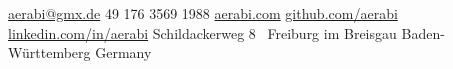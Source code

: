\documentclass[10pt,a4paper]{article}
\begin{document}
\sloppy  %



\nobreakvspace{0.3em}  %

\noindent\href{mailto:aerabi.at.gmx.dot.de}{aerabi\mbox{}@\mbox{}gmx.de}\sbull
\textsmaller{+}49 176 3569 1988\sbull
\href{http://aerabi.com}{aerabi.com}\sbull 
\href{https://github.com/aerabi}{github.com/aerabi} \sbull
\href{http://www.linkedin.com/in/aerabi}{linkedin.com/in/aerabi} \sbull
Schildackerweg 8 \thinspace\ {\sc Freiburg im Breisgau}\sbull
Baden-W\"urttemberg\sbull
{\sc Germany}

\spacedhrule{0.9em}{-0.4em}  %






\end{document}
